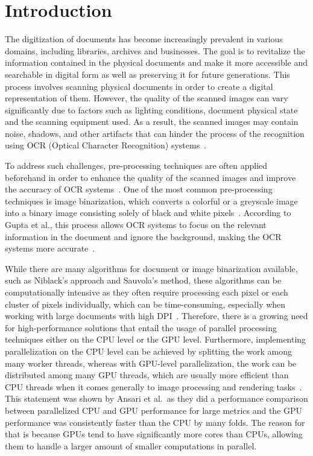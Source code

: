 \section{Introduction}

The digitization of documents has become increasingly prevalent in various domains, including libraries, archives and businesses. The goal is to revitalize the information contained in the physical documents and make it more accessible and searchable in digital form as well as preserving it for future generations. This process involves scanning physical documents in order to create a digital representation of them. However, the quality of the scanned images can vary significantly due to factors such as lighting conditions, document physical state and the scanning equipment used. As a result, the scanned images may contain noise, shadows, and other artifacts that can hinder the process of the recognition using OCR (Optical Character Recognition) systems~\cite{Souibgui_2022}.

To address such challenges, pre-processing techniques are often applied beforehand in order to enhance the quality of the scanned images and improve the accuracy of OCR systems~\cite{GUPTA2007389}. One of the most common pre-processing techniques is image binarization, which converts a colorful or a greyscale image into a binary image consisting solely of black and white pixels~\cite{10.1007/s42979-020-00176-1}. According to Gupta et al., this process allows OCR systems to focus on the relevant information in the document and ignore the background, making the OCR systems more accurate~\cite{GUPTA2007389}.

While there are many algorithms for document or image binarization available, such as Niblack's approach and Sauvola's method, these algorithms can be computationally intensive as they often require processing each pixel or each cluster of pixels individually, which can be time-consuming, especially when working with large documents with high DPI~\cite{10.5120/3877-5418,10.1007/s11042-014-2269-7}. Therefore, there is a growing need for high-performance solutions that entail the usage of parallel processing techniques either on the CPU level or the GPU level. Furthermore, implementing parallelization on the CPU level can be achieved by splitting the work among many worker threads, whereas with GPU-level parallelization, the work can be distributed among many GPU threads, which are usually more efficient than CPU threads when it comes generally to image processing and rendering tasks~\cite{ansari2025acceleratingmatrixmultiplicationperformance}. This statement was shown by Ansari et al.\ as they did a performance comparison between parallelized CPU and GPU performance for large metrics and the GPU performance was consistently faster than the CPU by many folds. The reason for that is because GPUs tend to have significantly more cores than CPUs, allowing them to handle a larger amount of smaller computations in parallel.